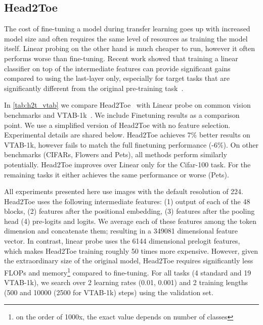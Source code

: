\documentclass{article}
\begin{document}
\subsection{Head2Toe}
The cost of fine-tuning a model during transfer learning goes up with increased model size and often requires the same level of resources as training the model itself. Linear probing on the other hand is much cheaper to run, however it often performs worse than fine-tuning. Recent work showed that training a linear classifier on top of the intermediate features can provide significant gains compared to using the last-layer only, especially for target tasks that are significantly different from the original pre-training task~\citep{evci22h2t,Adler2020CrossDomainFL, khalifa2022}. 

In \cref{tab:h2t_vtab} we compare Head2Toe~\citep{evci22h2t} with Linear probe on common vision benchmarks and VTAB-1k~\citep{zhai2019large}. We include Finetuning results as a comparison point. We use a simplified version of Head2Toe with no feature selection. Experimental details are shared below. Head2Toe achieves 7\% better results on VTAB-1k, however fails to match the full finetuning performance (-6\%). On other benchmarks (CIFARs, Flowers and Pets), all methods perform similarly potentially. Head2Toe improves over Linear only for the Cifar-100 task. For the remaining tasks it either achieves the same performance or worse (Pets).

All experiments presented here use images with the default resolution of 224. Head2Toe uses the following intermediate features: (1) output of each of the 48 blocks, (2) features after the positional embedding, (3) features after the pooling head (4) pre-logits and logits. We average each of these features among the token dimension and concatenate them; resulting in a 349081 dimensional feature vector. In contrast, linear probe uses the 6144 dimensional prelogit features, which makes Head2Toe training roughly 50 times more expensive. However, given the extraordinary size of the original model, Head2Toe requires significantly less FLOPs and memory\footnote{on the order of 1000x, the exact value depends on number of classes} compared to fine-tuning. For all tasks (4 standard and 19 VTAB-1k), we search over 2 learning rates (0.01, 0.001) and 2 training lengths (500 and 10000 (2500 for VTAB-1k) steps) using the validation set.
\end{document}
